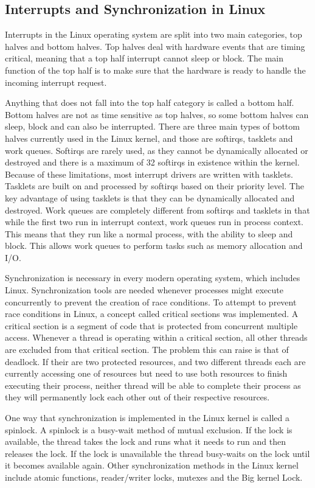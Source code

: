 \documentclass[10pt,serif,draftclsnofoot,onecolumn]{IEEEtran}
\begin{document}
	\subsection{Interrupts and Synchronization in Linux}
	\par
	Interrupts in the Linux operating system are split into two main categories, top halves and bottom halves. Top halves deal with hardware events that are timing critical, meaning that a top half interrupt cannot sleep or block. The main function of the top half is to make sure that the hardware is ready to handle the incoming interrupt request.
	\newline
	\par
	Anything that does not fall into the top half category is called a bottom half. Bottom halves are not as time sensitive as top halves, so some bottom halves can sleep, block and can also be interrupted. There are three main types of bottom halves currently used in the Linux kernel, and those are softirqs, tasklets and work queues\cite{2}. Softirqs are rarely used, as they cannot be dynamically allocated or destroyed and there is a maximum of 32 softirqs in existence within the kernel. Because of these limitations, most interrupt drivers are written with tasklets. Tasklets are built on and processed by softirqs based on their priority level. The key advantage of using tasklets is that they can be dynamically allocated and destroyed\cite{2}. Work queues are completely different from softirqs and tasklets in that while the first two run in interrupt context, work queues run in process context. This means that they run like a normal process, with the ability to sleep and block. This allows work queues to perform tasks such as memory allocation and I/O.
	\newline
	\par
	Synchronization is necessary in every modern operating system, which includes Linux. Synchronization tools are needed whenever processes might execute concurrently to prevent the creation of race conditions. To attempt to prevent race conditions in Linux, a concept called critical sections was implemented. A critical section is a segment of code that is protected from concurrent multiple access\cite{21}. Whenever a thread is operating within a critical section, all other threads are excluded from that critical section. The problem this can raise is that of deadlock. If their are two protected resources, and two different threads each are currently accessing one of resources but need to use both resources to finish executing their process, neither thread will be able to complete their process as they will permanently lock each other out of their respective resources.
	\newline
	\par
	One way that synchronization is implemented in the Linux kernel is called a spinlock. A spinlock is a busy-wait method of mutual exclusion. If the lock is available, the thread takes the lock and runs what it needs to run and then releases the lock. If the lock is unavailable the thread busy-waits on the lock until it becomes available again\cite{21}. Other synchronization methods in the Linux kernel include atomic functions, reader/writer locks, mutexes and the Big kernel Lock.
\end{document}
